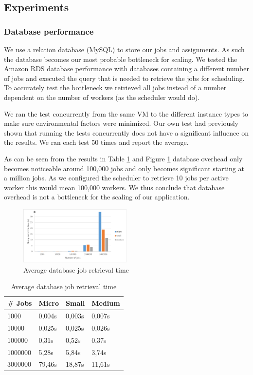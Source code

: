 \documentclass[a4paper]{IEEEtran}
\begin{document}
\subsection{Experiments}

\subsubsection{Database performance}

We use a relation database (MySQL) to store our jobs and assignments. As such the database becomes our most probable bottleneck for scaling. We tested the Amazon RDS database performance with databases containing a different number of jobs and executed the query that is needed to retrieve the jobs for scheduling. To accurately test the bottleneck we retrieved all jobs instead of a number dependent on the number of workers (as the scheduler would do).

We ran the test concurrently from the same VM to the different instance types to make sure environmental factors were minimized. Our own test had previously shown that running the tests concurrently does not have a significant influence on the results. We ran each test 50 times and report the average.

As can be seen from the results in Table \ref{dbperfresults} and Figure \ref{fig_dbperfresults} database overhead only becomes noticeable around 100,000 jobs and only becomes significant starting at a million jobs. As we configured the scheduler to retrieve 10 jobs per active worker this would mean 100,000 workers. We thus conclude that database overhead is not a bottleneck for the scaling of our application.

\begin{figure}
\centering
\includegraphics[width=0.5\textwidth]{"results-database"}
\caption{Average database job retrieval time}
\label{fig_dbperfresults}
\end{figure}

\begin{table}
\centering

\begin{tabular}{| l | l | l | l |}
\hline
\# Jobs & Micro & Small & Medium \\ \hline
1000 & 0,004s &	0,003s & 0,007s \\ \hline
10000 & 0,025s & 0,025s & 0,026s \\ \hline
100000 & 0,31s & 0,52s & 0,37s \\ \hline
1000000 & 5,28s & 5,84s & 3,74s \\ \hline
3000000	& 79,46s & 18,87s & 11,61s \\ \hline
\end{tabular}

\caption{Average database job retrieval time}
\label{dbperfresults}
\end{table}
\end{document}
